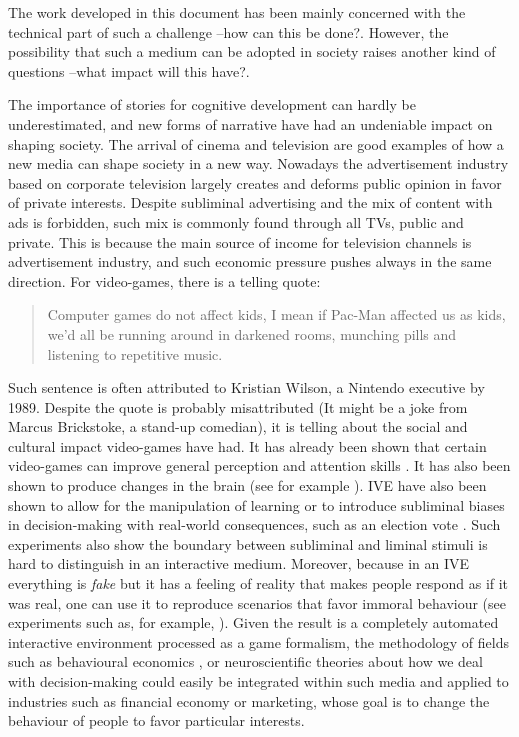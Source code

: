 \documentclass[
		twoside,openright,titlepage,numbers=noenddot,manychapters,
		headinclude,%
                footinclude=false,cleardoublepage=empty,
                BCOR=5mm,
		fontsize=11pt, %
                 enabledeprecatedfontcommands]{scrreprt}
\begin{document}
The work developed in this document has been mainly concerned with the technical part of such a challenge --how can this be done?. However, the possibility that such a medium can be adopted in society raises another kind of questions --what impact will this have?. %




The importance of stories for cognitive development can hardly be underestimated, and new forms of narrative have had an undeniable impact on shaping society. The arrival of cinema and television are good examples of how a new media can shape society in a new way. Nowadays the advertisement industry based on corporate television largely creates and deforms public opinion in favor of private interests. Despite subliminal advertising and the mix of content with ads is forbidden, such mix is commonly found through all TVs, public and private. This is because the main source of income for television channels is advertisement industry, and such economic pressure pushes always in the same direction.
For video-games, there is a telling quote:
\begin{quote}
Computer games do not affect kids, I mean if Pac-Man affected us as kids, we'd all be running around in darkened rooms, munching pills and listening to repetitive music. 
\end{quote}

Such sentence is often attributed to Kristian Wilson, a Nintendo executive by 1989. Despite the quote is probably misattributed (It might be  a joke from Marcus Brickstoke, a stand-up comedian), it is telling about the social and cultural impact video-games have had. 
It has already been shown that certain video-games can improve general perception and attention skills \cite[]{Green2003,Green2007,Green2010}. 
It has also been shown to produce changes in the brain (see for example \cite{mathiak2006toward}). IVE have also been shown to allow for the manipulation of learning \cite[]{Okita2008} or to introduce subliminal biases in decision-making with real-world consequences, such as an election vote \cite[]{bailenson2008facial}. Such experiments also show the boundary between subliminal and liminal stimuli is hard to distinguish in an interactive medium. 
Moreover, because in an IVE everything is \emph{fake} but it has a feeling of reality that makes people respond as if it was real, one can use it to reproduce scenarios that favor immoral behaviour (see experiments such as, for example,  \cite{slater2006virtual,rovira2009use}). 
Given the result is a completely automated interactive environment processed as a game formalism, the methodology of fields such as behavioural economics \cite[]{kahneman2009foundations}, or neuroscientific theories about how we deal with decision-making \cite[]{sanfey2007social} could easily be integrated within such media and applied to industries such as financial economy or marketing, whose goal is to change the behaviour of people to favor particular interests. 
\end{document}
